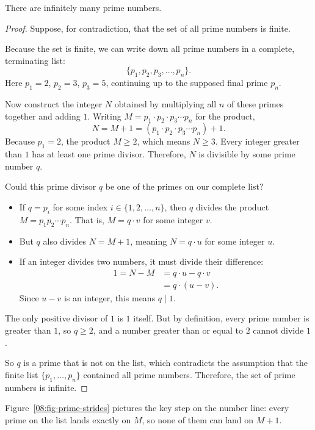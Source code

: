 \begin{theorem}[Euclid]\label{08:thm-primes}
There are infinitely many prime numbers.
\end{theorem}

\begin{proof}
Suppose, for contradiction, that the set of all prime numbers is finite. 

Because the set is finite, we can write down all prime numbers in a complete, terminating list:
\[
\{p_1, p_2, p_3, \ldots, p_n\}.
\]
Here $p_1 = 2$, $p_2 = 3$, $p_3 = 5$, continuing up to the supposed final prime $p_n$.

Now construct the integer $N$ obtained by multiplying all $n$ of these primes together and adding $1$. Writing $M = p_1 \cdot p_2 \cdot p_3 \cdots p_n$ for the product,
\[
N = M + 1 = (p_1 \cdot p_2 \cdot p_3 \cdots p_n) + 1.
\]
Because $p_1 = 2$, the product $M \ge 2$, which means $N \ge 3$. Every integer greater than $1$ has at least one prime divisor. Therefore, $N$ is divisible by some prime number $q$.

Could this prime divisor $q$ be one of the primes on our complete list?
\begin{itemize}
\item If $q = p_i$ for some index $i \in \{1, 2, \ldots, n\}$, then $q$ divides the product $M = p_1 p_2 \cdots p_n$. That is, $M = q \cdot v$ for some integer $v$.
\item But $q$ also divides $N = M + 1$, meaning $N = q \cdot u$ for some integer $u$.
\item If an integer divides two numbers, it must divide their difference:
\begin{align*}
1 = N - M &= q \cdot u - q \cdot v \\
&= q \cdot (u - v).
\end{align*}
Since $u - v$ is an integer, this means $q \mid 1$.
\end{itemize}
The only positive divisor of $1$ is $1$ itself. But by definition, every prime number is greater than $1$, so $q \ge 2$, and a number greater than or equal to $2$ cannot divide $1$.

So $q$ is a prime that is not on the list, which contradicts the assumption that the finite list $\{p_1, \ldots, p_n\}$ contained all prime numbers. Therefore, the set of prime numbers is infinite.
\end{proof}

Figure~\ref{08:fig-prime-strides} pictures the key step on the number line: every prime on the list lands exactly on $M$, so none of them can land on $M + 1$.

